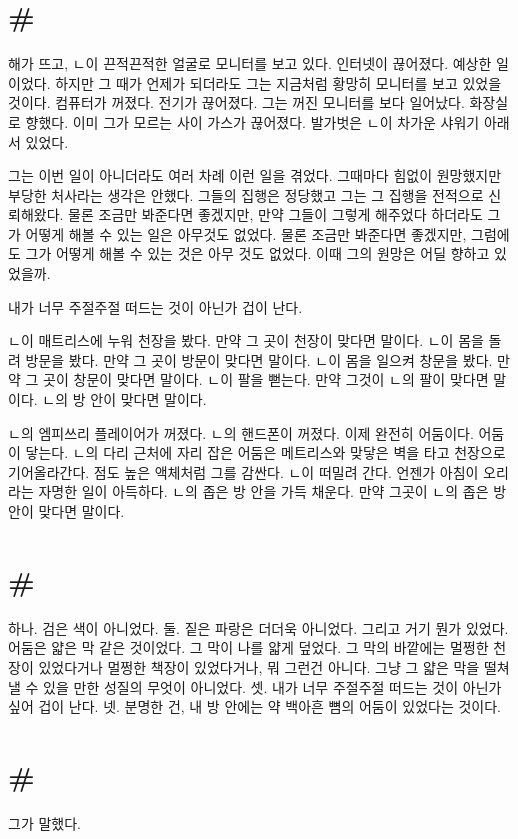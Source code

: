 \documentclass[a5paper,10pt, twoside, openright]{memoir}
\begin{document}
	\section{\#}
	해가 뜨고, ㄴ이 끈적끈적한 얼굴로 모니터를 보고 있다. 인터넷이 끊어졌다. 예상한 일이었다. 하지만 그 때가 언제가 되더라도 그는 지금처럼 황망히 모니터를 보고 있었을 것이다. 컴퓨터가 꺼졌다. 전기가 끊어졌다. 그는 꺼진 모니터를 보다 일어났다. 화장실로 향했다. 이미 그가 모르는 사이 가스가 끊어졌다. 발가벗은 ㄴ이 차가운 샤워기 아래 서 있었다.

	그는 이번 일이 아니더라도 여러 차례 이런 일을 겪었다. 그때마다 힘없이 원망했지만 부당한 처사라는 생각은 안했다. 그들의 집행은 정당했고 그는 그 집행을 전적으로 신뢰해왔다. 물론 조금만 봐준다면 좋겠지만, 만약 그들이 그렇게 해주었다 하더라도 그가 어떻게 해볼 수 있는 일은 아무것도 없었다. 물론 조금만 봐준다면 좋겠지만, 그럼에도 그가 어떻게 해볼 수 있는 것은 아무 것도 없었다. 이때 그의 원망은 어딜 향하고 있었을까.

	내가 너무 주절주절 떠드는 것이 아닌가 겁이 난다.

	ㄴ이 매트리스에 누워 천장을 봤다. 만약 그 곳이 천장이 맞다면 말이다. ㄴ이 몸을 돌려 방문을 봤다. 만약 그 곳이 방문이 맞다면 말이다. ㄴ이 몸을 일으켜 창문을 봤다. 만약 그 곳이 창문이 맞다면 말이다. ㄴ이 팔을 뻗는다. 만약 그것이 ㄴ의 팔이 맞다면 말이다. ㄴ의 방 안이 맞다면 말이다. 

	ㄴ의 엠피쓰리 플레이어가 꺼졌다. ㄴ의 핸드폰이 꺼졌다. 이제 완전히 어둠이다. 어둠이 닿는다. ㄴ의 다리 근처에 자리 잡은 어둠은 메트리스와 맞닿은 벽을 타고 천장으로 기어올라간다. 점도 높은 액체처럼 그를 감싼다. ㄴ이 떠밀려 간다. 언젠가 아침이 오리라는 자명한 일이 아득하다. ㄴ의 좁은 방 안을 가득 채운다. 만약 그곳이 ㄴ의 좁은 방 안이 맞다면 말이다.

	\section{\#}
	하나. 검은 색이 아니었다. 둘. 짙은 파랑은 더더욱 아니었다. 그리고 거기 뭔가 있었다. 어둠은 얇은 막 같은 것이었다. 그 막이 나를 얇게 덮었다. 그 막의 바깥에는 멀쩡한 천장이 있었다거나 멀쩡한 책장이 있었다거나, 뭐 그런건 아니다. 그냥 그 얇은 막을 떨쳐낼 수 있을 만한 성질의 무엇이 아니었다. 셋. 내가 너무 주절주절 떠드는 것이 아닌가 싶어 겁이 난다. 넷. 분명한 건, 내 방 안에는 약 백아흔 뼘의 어둠이 있었다는 것이다. 

	\section{\#}
	그가 말했다. 
	
\end{document}
